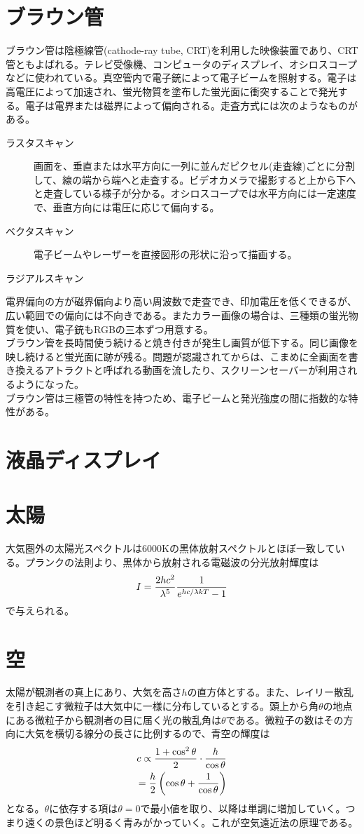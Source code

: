 \documentclass{jsarticle}
\begin{document}
	\section{ブラウン管}
		ブラウン管は陰極線管(cathode-ray tube, CRT)を利用した映像装置であり、CRT管ともよばれる。テレビ受像機、コンピュータのディスプレイ、オシロスコープなどに使われている。真空管内で電子銃によって電子ビームを照射する。電子は高電圧によって加速され、蛍光物質を塗布した蛍光面に衝突することで発光する。電子は電界または磁界によって偏向される。走査方式には次のようなものがある。
		\begin{description}
			\item[ラスタスキャン] 画面を、垂直または水平方向に一列に並んだピクセル(走査線)ごとに分割して、線の端から端へと走査する。ビデオカメラで撮影すると上から下へと走査している様子が分かる。オシロスコープでは水平方向には一定速度で、垂直方向には電圧に応じて偏向する。
			\item[ベクタスキャン] 電子ビームやレーザーを直接図形の形状に沿って描画する。
			\item[ラジアルスキャン]
		\end{description}
		電界偏向の方が磁界偏向より高い周波数で走査でき、印加電圧を低くできるが、広い範囲での偏向には不向きである。またカラー画像の場合は、三種類の蛍光物質を使い、電子銃もRGBの三本ずつ用意する。\\
		ブラウン管を長時間使う続けると焼き付きが発生し画質が低下する。同じ画像を映し続けると蛍光面に跡が残る。問題が認識されてからは、こまめに全画面を書き換えるアトラクトと呼ばれる動画を流したり、スクリーンセーバーが利用されるようになった。\\
		ブラウン管は三極管の特性を持つため、電子ビームと発光強度の間に指数的な特性がある。
	\section{液晶ディスプレイ}

	\section{太陽}
		大気圏外の太陽光スペクトルは6000Kの黒体放射スペクトルとほぼ一致している。プランクの法則より、黒体から放射される電磁波の分光放射輝度は
			\[I = \frac{2hc^2}{\lambda^5}\frac{1}{e^{hc/\lambda kT} - 1}\]
		で与えられる。
	\section{空}
		太陽が観測者の真上にあり、大気を高さ$h$の直方体とする。また、レイリー散乱を引き起こす微粒子は大気中に一様に分布しているとする。頭上から角$\theta$の地点にある微粒子から観測者の目に届く光の散乱角は$\theta$である。微粒子の数はその方向に大気を横切る線分の長さに比例するので、青空の輝度は
		\begin{align*}
			c \propto \frac{1 + \cos^2\theta}{2}\cdot \frac{h}{\cos\theta}\\
			= \frac{h}{2}\left(\cos\theta + \frac{1}{\cos\theta} \right)
		\end{align*}
		となる。$\theta$に依存する項は$\theta = 0$で最小値を取り、以降は単調に増加していく。つまり遠くの景色ほど明るく青みがかっていく。これが空気遠近法の原理である。
\end{document}
